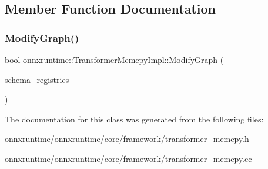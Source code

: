 \subsection{Member Function Documentation}
\mbox{\label{classonnxruntime_1_1TransformerMemcpyImpl_a5a3b2664aa3fad59586d08ac6bc8dd1d}} 
\subsubsection{\texorpdfstring{Modify\+Graph()}{ModifyGraph()}}
{\footnotesize\ttfamily bool onnxruntime\+::\+Transformer\+Memcpy\+Impl\+::\+Modify\+Graph (\begin{DoxyParamCaption}\item[{const \mbox{\hyperlink{classonnxruntime_1_1KernelRegistryManager}{Kernel\+Registry\+Manager}} \&}]{schema\+\_\+registries }\end{DoxyParamCaption})}



The documentation for this class was generated from the following files\+:\begin{DoxyCompactItemize}
\item 
onnxruntime/onnxruntime/core/framework/\mbox{\hyperlink{transformer__memcpy_8h}{transformer\+\_\+memcpy.\+h}}\item 
onnxruntime/onnxruntime/core/framework/\mbox{\hyperlink{transformer__memcpy_8cc}{transformer\+\_\+memcpy.\+cc}}\end{DoxyCompactItemize}
